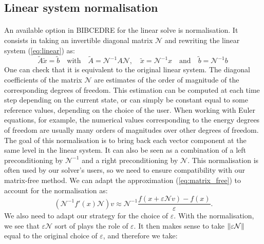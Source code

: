     \pagebreak
    \subsection{Linear system normalisation}

      \paragraph{}
      An available option in BIBCEDRE for the linear solve is normalisation.
      It consists in taking an invertible diagonal matrix $\mathcal{N}$ and rewriting the linear system (\ref{eq:linear}) as:
      \begin{equation}
        \tilde{A}\tilde{x} = \tilde{b}
        \quad\textrm{with}\quad \tilde{A} = \mathcal{N}^{-1} A \mathcal{N},
        \quad \tilde{x} = \mathcal{N}^{-1} x
        \quad\textrm{and}\quad \tilde{b} = \mathcal{N}^{-1} b \
      \end{equation}
      One can check that it is equivalent to the original linear system.
      The diagonal coefficients of the matrix $\mathcal{N}$ are estimates of the order of magnitude of the corresponding degrees of freedom.
      This estimation can be computed at each time step depending on the current state, or can simply be constant equal to some reference values, depending on the choice of the user.
      When working with Euler equations, for example, the numerical values corresponding to the energy degrees of freedom are usually many orders of magnitudes over other degrees of freedom.
      The goal of this normalisation is to bring back each vector component at the same level in the linear system.
      It can also be seen as a combination of a left preconditioning by $\mathcal{N}^{-1}$ and a right preconditioning by $\mathcal{N}$.
      This normalisation is often used by our solver's users, so we need to ensure compatibility with our matrix-free method.
      We can adapt the approximation (\ref{eq:matrix_free}) to account for the normalisation as:
      \begin{equation}
        \left( \mathcal{N}^{-1} f'\left(x\right) \mathcal{N} \right) v \approx \mathcal{N}^{-1} \frac{f\left(x + \varepsilon \mathcal{N} v\right) - f\left(x\right)}{\varepsilon} .
      \end{equation}
      We also need to adapt our strategy for the choice of $\varepsilon$.
      With the normalisation, we see that $\varepsilon \mathcal{N}$ sort of plays the role of $\varepsilon$.
      It then makes sense to take $\norm{\varepsilon \mathcal{N}}$ equal to the original choice of $\varepsilon$, and therefore we take:
